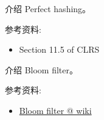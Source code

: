 \documentclass[a4paper, justified]{tufte-handout}
\begin{document}
\begin{solution}
\end{solution}

\begin{problem}[TC ]
\end{problem}

\begin{solution}
\end{solution}

\begin{problem}[TC ]
\end{problem}

\begin{solution}
\end{solution}

\begin{problem}[TC ]
\end{problem}

\begin{solution}
\end{solution}

\beginoptional

\begin{problem}[]
\end{problem}

\begin{solution}
\end{solution}

\beginot

\begin{ot}
  介绍 Perfect hashing。

  \noindent 参考资料:
  \begin{itemize}
    \item Section 11.5 of CLRS
  \end{itemize}
\end{ot}

\begin{ot}
  介绍 Bloom filter。

  \noindent 参考资料:
  \begin{itemize}
    \item \href{https://en.wikipedia.org/wiki/Bloom\_filter}{Bloom filter @ wiki}
  \end{itemize}
\end{ot}
\end{document}
